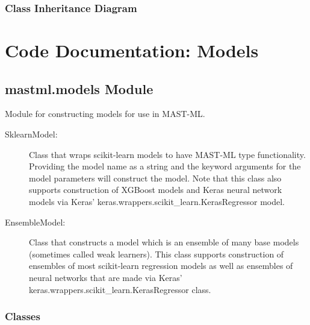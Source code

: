 \documentclass[letterpaper,10pt,english]{sphinxmanual}
\begin{document}
\subsection{Class Inheritance Diagram}
\label{\detokenize{10_metrics:class-inheritance-diagram}}


\chapter{Code Documentation: Models}
\label{\detokenize{11_models:code-documentation-models}}\label{\detokenize{11_models::doc}}

\section{mastml.models Module}
\label{\detokenize{11_models:module-mastml.models}}\label{\detokenize{11_models:mastml-models-module}}
Module for constructing models for use in MAST-ML.
\begin{description}
\item[{SklearnModel:}] \leavevmode
Class that wraps scikit-learn models to have MAST-ML type functionality. Providing the model name as a string
and the keyword arguments for the model parameters will construct the model. Note that this class also supports
construction of XGBoost models and Keras neural network models via Keras’ keras.wrappers.scikit\_learn.KerasRegressor
model.

\item[{EnsembleModel:}] \leavevmode
Class that constructs a model which is an ensemble of many base models (sometimes called weak learners). This
class supports construction of ensembles of most scikit-learn regression models as well as ensembles of neural
networks that are made via Keras’ keras.wrappers.scikit\_learn.KerasRegressor class.

\end{description}


\subsection{Classes}
\label{\detokenize{11_models:classes}}
\end{document}
